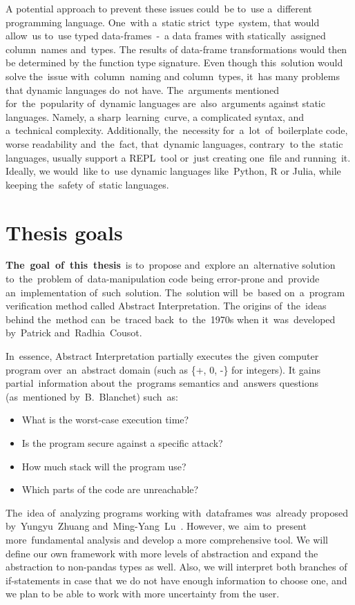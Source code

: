 A potential approach to prevent these issues could~be to~use a~different programming language.
One~with a~static strict~type~system, that would allow~us to~use typed data-frames~-~a data frames with statically~assigned
column~names and~types.
The results of data-frame transformations would then be determined by the function type signature.
Even though this~solution would solve the~issue with~column~naming and column~types, it~has many problems that dynamic
languages do~not have.
The~arguments mentioned for~the~popularity of~dynamic languages are~also~arguments against static languages.
Namely, a sharp~learning~curve, a complicated syntax, and a~technical complexity.
Additionally, the~necessity for~a~lot~of~boilerplate code, worse readability and~the~fact, that~dynamic languages,
contrary~to the~static languages, usually support a REPL~tool or~just creating one~file and running~it.
Ideally, we would~like to~use dynamic languages like~Python, R or Julia, while keeping the~safety of~static languages.

\section*{Thesis goals}
\textbf{The~goal~of~this~thesis}~is to~propose and~explore an~alternative solution to~the~problem of~data-manipulation
code being error-prone and~provide an~implementation of~such~solution.
The~solution will~be~based on~a~program verification method called Abstract Interpretation.
The origins of~the~ideas behind the~method can~be~traced back~to~the~1970s when it~was~developed by~Patrick
and~Radhia~Cousot\cite{Cousot:1977:AI}.

In~essence, Abstract Interpretation partially executes the~given computer program over~an~abstract domain
(such as \{+, 0, -\} for integers).
It gains partial~information about the~programs semantics and~answers questions (as~mentioned
by~B.~Blanchet\cite{Blanchet:2002:AI}) such~as:
\begin{itemize}
    \item What is the worst-case execution time?
    \item Is the program secure against a specific attack?
    \item How much stack will the program use?
    \item Which parts of the code are unreachable?
\end{itemize}

The~idea of~analyzing programs working with~dataframes was~already proposed by~Yungyu~Zhuang
and~Ming-Yang~Lu~\cite{Zhuang:2022:TypeChecking}.
However, we~aim to~present more~fundamental analysis and develop a more comprehensive tool.
We will define our own framework with more levels of abstraction and expand the abstraction to non-pandas types as well.
Also, we will interpret both branches of if-statements in case that we do not have enough information to choose one, and
we plan to be able to work with more uncertainty from the user.

